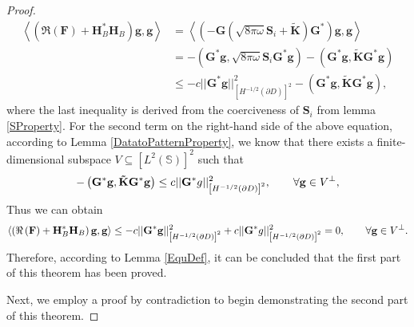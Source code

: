 \documentclass[11pt,reqno,twoside]{amsart}
\theoremstyle{definition}
\theoremstyle{remark}
\numberwithin{equation}{section}
\begin{document}
\begin{proof}
\begin{equation}\begin{aligned}
		\left\langle \left( \Re\left( \mathbf F\right)+\mathbf H^*_B\mathbf H_B\right) \mathbf g, \mathbf g\right\rangle 
		&= \left\langle \left(-\mathbf G \left( \sqrt{8\pi\omega} \mathbf S_{i}+\mathbf{\tilde{K}} \right) \mathbf G^* \right) \mathbf g, \mathbf g\right\rangle  \\
		&= -\left(  \mathbf G^* \mathbf g, \sqrt{8\pi\omega} \mathbf S_{i}\mathbf G^* \mathbf g \right)  -\left(  \mathbf G^* \mathbf g, \mathbf{\tilde{K}}\mathbf G^* \mathbf g \right)  \\
		&\leq -c || \mathbf G^* \mathbf g ||^2_{\left[H^{-1/2}\left(\partial D \right) \right]^2} - \left(  \mathbf G^* \mathbf g, \mathbf{\tilde{K}}\mathbf G^* \mathbf g \right) ,
\end{aligned}\end{equation}
	where the last inequality is derived from the coerciveness of $\mathbf S_{i}$ from lemma \ref{SProperty}. For the second term on the right-hand side of the above equation, according to Lemma \ref{DatatoPatternProperty}, we know that there exists a finite-dimensional subspace $V \subseteq \left[L^{2}\left(\mathbb S \right) \right]^2$ such that
	$$
	 - \left(  \mathbf G^* \mathbf g, \mathbf{\tilde{K}}\mathbf G^* \mathbf g \right) \leq c ||\mathbf G ^* \mathbf \mathbf g||_{\left[H^{-1/2}\left(\partial D\right) \right] ^2} ^2, \qquad \forall \mathbf g \in V^\perp,
	$$
	Thus we can obtain 
	$$
	\left\langle \left( \Re\left( \mathbf F\right)+\mathbf H^*_B\mathbf H_B\right) \mathbf g, \mathbf g\right\rangle  \leq -c || \mathbf G^* \mathbf g ||^2_{\left[H^{-1/2}\left(\partial D \right) \right]^2} + c ||\mathbf G ^* \mathbf \mathbf g||_{\left[H^{-1/2}\left(\partial D\right) \right] ^2} ^2=0,\qquad \forall \mathbf g \in V^\perp.
	$$
	Therefore, according to Lemma \ref{EquDef}, it can be concluded that the first part of this theorem has been proved.
	
	Next, we employ a proof by contradiction to begin demonstrating the second part of this theorem.
	

\end{proof}
\end{document}
